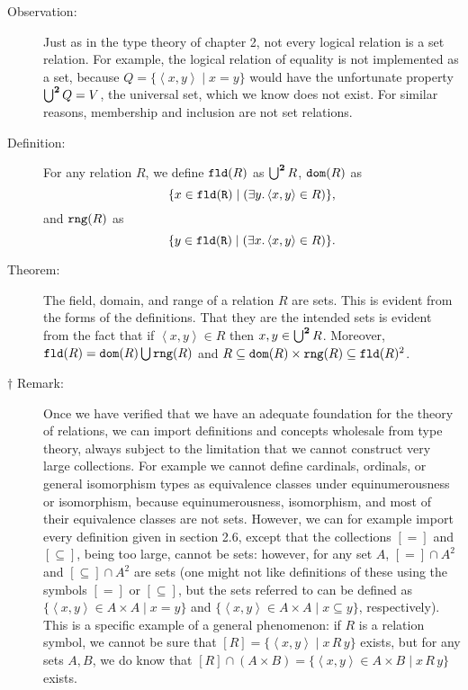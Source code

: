 \documentclass[12pt]{book}
\begin{document}
\begin{description}
\item[Observation:] Just as in the type theory of chapter 2, not every logical relation
is a set relation.  For example, the logical relation of equality is
not implemented as a set, because $Q=\{\left<x,y\right> \mid x=y\}$
would have the unfortunate property $\bigcup^{\bf 2} Q = V$, the
universal set, which we know does not exist.  For similar reasons,
membership and inclusion are not set relations.

\item[Definition:] For any relation $R$, we define ${\tt fld}(R)$ as
$\bigcup^{\bf 2} R$, ${\tt dom}(R)$ as $$\{x \in {\tt fld(R)} \mid
(\exists y.\left<x,y\right> \in R)\},$$ and ${\tt rng}(R)$ as $$\{y \in {\tt fld(R)} \mid
(\exists x.\left<x,y\right> \in R)\}.$$

\item[Theorem:] The field, domain, and range of a relation $R$ are
sets.  This is evident from the forms of the definitions.  That they
are the intended sets is evident from the fact that if
$\left<x,y\right> \in R$ then $x,y \in \bigcup^{\bf 2} R$.  Moreover,
${\tt fld}(R) = {\tt dom}(R) \bigcup {\tt rng}(R)$ and $R \subseteq
{\tt dom}(R) \times {\tt rng}(R) \subseteq {\tt fld}(R)^2$.

\end{description}

\begin{description}

\item[$\dagger$ Remark:]  Once we have verified that we have an adequate foundation for the
theory of relations, we can import definitions and concepts wholesale
from type theory, always subject to the limitation that we cannot
construct very large collections.  For example we cannot define
cardinals, ordinals, or general isomorphism types as equivalence
classes under equinumerousness or isomorphism, because
equinumerousness, isomorphism, and most of their equivalence classes
are not sets.  However, we can for example import every definition given in section 2.6,
except that the collections $[=]$ and $[\subseteq]$, being too large, cannot be sets:  however, for any set $A$,
$[=] \cap A^2$ and $[\subseteq]\cap A^2$ are sets (one might not like definitions of these using the symbols $[=]$
or $[\subseteq]$, but the sets referred to can be defined as $\{\left<x,y\right>\in A\times A \mid x=y\}$ and $\{\left<x,y\right>\in A \times A \mid x \subseteq y\}$, respectively).  This is a specific example of a general phenomenon:  if $R$ is a relation symbol, we cannot be sure that
$[R] = \{\left<x,y\right>\mid x\, R \, y\}$ exists, but for any sets $A,B$, we do know that $[R] \cap (A \times B) = \{\left<x,y\right>\in A \times B \mid x \,R\,y\}$ exists.

\end{description}
\end{document}
